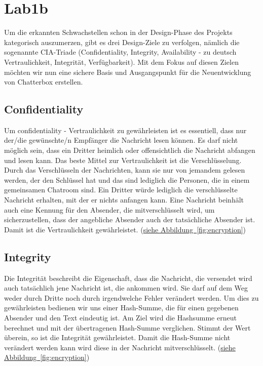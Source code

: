 \documentclass[12pt,a4paper,titlepage,oneside]{scrartcl}
\begin{document}
\section{Lab1b}

Um die erkannten Schwachstellen schon in der Design-Phase des Projekts kategorisch auszumerzen, gibt es drei Design-Ziele zu verfolgen, n\"amlich die sogenannte CIA-Triade (Confidentiality, Integrity, Availability - zu deutsch Vertraulichkeit, Integrit\"at, Verf\"ugbarkeit). Mit dem Fokus auf diesen Zielen m\"ochten wir nun eine sichere Basis und Ausgangspunkt f\"ur die Neuentwicklung von Chatterbox erstellen.

\subsection{Confidentiality}
Um confidentiality - Vertraulichkeit zu gew\"ahrleisten ist es essentiell, dass nur der/die gew\"unschte/n Empf\"anger die Nachricht lesen k\"onnen. Es darf nicht m\"oglich sein, dass ein Dritter heimlich oder offensichtlich die Nachricht abfangen und lesen kann. Das beste Mittel zur Vertraulichkeit ist die Verschl\"usselung. Durch das Verschl\"usseln der Nachrichten, kann sie nur von jemandem gelesen werden, der den Schl\"ussel hat und das sind lediglich die Personen, die in einem gemeinsamen Chatroom sind. Ein Dritter w\"urde lediglich die verschl\"usselte Nachricht erhalten, mit der er nichts anfangen kann. Eine Nachricht beinh\"alt auch eine Kennung f\"ur den Absender, die mitverschl\"usselt wird, um sicherzustellen, dass der angebliche Absender auch der tats\"achliche Absender ist. Damit ist die Vertraulichkeit gew\"ahrleistet. (\hyperref[fig:encryption]{siehe Abbildung~\ref*{fig:encryption}})

\subsection{Integrity}
Die Integrit\"at beschreibt die Eigenschaft, dass die Nachricht, die versendet wird auch tats\"achlich jene Nachricht ist, die ankommen wird. Sie darf auf dem Weg weder durch Dritte noch durch irgendwelche Fehler ver\"andert werden. Um dies zu gew\"ahrleisten bedienen wir uns einer Hash-Summe, die f\"ur einen gegebenen Absender und den Text eindeutig ist. Am Ziel wird die Hashsumme erneut berechnet und mit der \"ubertragenen Hash-Summe verglichen. Stimmt der Wert \"uberein, so ist die Integrit\"at gew\"ahrleistet. Damit die Hash-Summe nicht ver\"andert werden kann wird diese in der Nachricht mitverschl\"usselt. (\hyperref[fig:encryption]{siehe Abbildung~\ref*{fig:encryption}})
\end{document}
